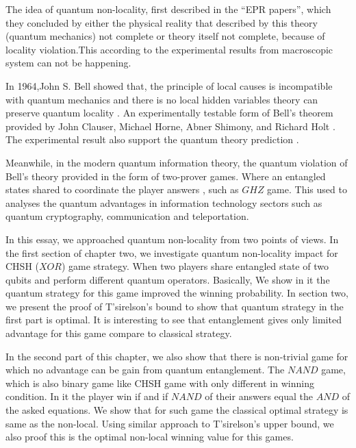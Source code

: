 The idea of quantum non-locality,
first described in the “EPR papers”\citep*{EPR}, which they concluded by either the physical reality that described by this theory (quantum mechanics) not complete or theory itself not complete, because of locality violation.This according to the experimental results from  macroscopic system can not be happening. 

In 1964,John S. Bell showed that, the principle of local causes is incompatible with quantum mechanics and there is no local hidden variables theory can preserve quantum locality \citep*{book:800289}. An experimentally testable form of Bell's theorem provided by John Clauser, Michael Horne, Abner Shimony, and Richard Holt \citep*{PhysRevLett.23.880}. The experimental result also support the quantum theory prediction  \cite*{rowe2001experimental}.

Meanwhile, in the modern quantum information theory, the quantum  violation of Bell's theory provided in the form of two-prover games. Where an entangled states shared to coordinate the player answers \cite*{PhysRevLett.82.1052}, such as $GHZ$ game. This used to analyses the quantum advantages in information technology sectors such as quantum cryptography, communication and teleportation.

In this essay, we approached quantum non-locality from two points of views. In the first section of chapter two, we investigate quantum  non-locality  impact for CHSH ($XOR$) game strategy. When two  players share entangled state of two qubits and perform different quantum operators. Basically, We show  in it the quantum strategy for this game improved the winning probability. In section two, we present the proof of T'sirelson's bound \citep*{Cirel'son1980} to show that quantum strategy in the first part is optimal. It is interesting to see that entanglement gives only limited advantage for this game compare to classical strategy.

In the second part of this chapter, we also show that there is non-trivial game for which no advantage can be gain from quantum entanglement. 
The $NAND$ game, which is also binary game like CHSH game with only different in winning condition. In it the player win if and if  $NAND$ of their answers equal the $AND$ of the asked equations. We show that for such game the classical optimal strategy is same as the non-local.
Using similar approach to T'sirelson's upper bound, we also proof this is the optimal non-local winning value for this games.





